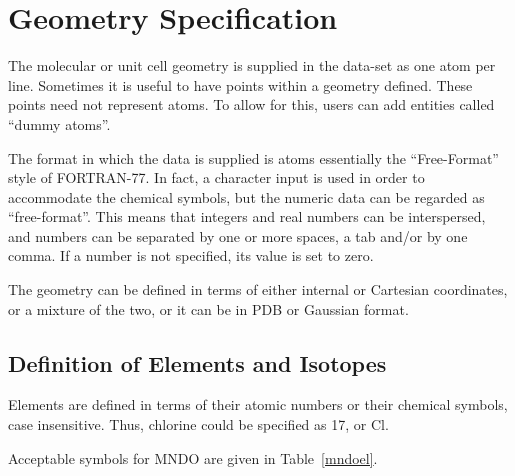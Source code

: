 \section{Geometry Specification} \label{geometry}
The molecular or unit cell geometry is supplied in the data-set as one atom per
line.   Sometimes it is useful to have points
within a geometry defined.  These points need not represent atoms.  To allow
for this, users can add entities called ``dummy atoms''.

The format in which the data is supplied is atoms essentially the
``Free-Format''   style of FORTRAN-77.   In  fact, a character input is used in
order to accommodate the  chemical  symbols,  but  the  numeric  data  can
be   regarded   as ``free-format''.    This  means
that  integers  and  real  numbers  can  be interspersed, and numbers can be
separated by one or more spaces, a tab and/or  by  one
comma.  If a number is not specified, its value is set to
zero.

The geometry can be defined in terms of either internal or Cartesian
coordinates, or a mixture of the two, or it can be in PDB or Gaussian format.

\subsection{Definition of Elements and Isotopes}
Elements are defined in terms  of  their  atomic  numbers  or  their chemical
symbols, case insensitive.   Thus, chlorine
could be specified as 17, or Cl.   

Acceptable symbols for MNDO are given in
Table~\ref{mndoel}.

